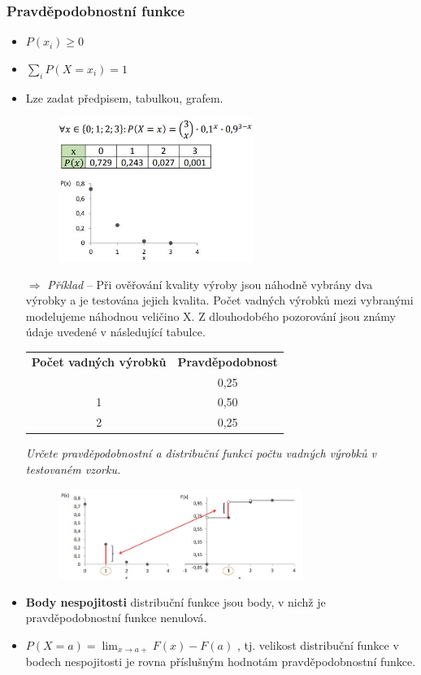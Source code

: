 \subsubsection{Pravděpodobnostní funkce}
			\begin{itemize}
				\item $P(x_i) \geq 0$
				\item $\sum_i P(X = x_i) = 1$
				\item Lze zadat předpisem, tabulkou, grafem.
				\begin{figure}[H]
					\centering
					\includegraphics[width=0.6\textwidth]{assets/11_dnv_prav}
				\end{figure}
				\item[$\Rightarrow$] \textit{Příklad} -- Při ověřování kvality výroby jsou náhodně vybrány dva výrobky a je testována jejich kvalita. Počet vadných výrobků mezi vybranými modelujeme náhodnou veličino X. Z dlouhodobého pozorování jsou známy údaje uvedené v následující tabulce.
				\begin{table}[H]
					\centering
					\begin{tabular}{c|c}
						\textbf{Počet vadných výrobků}            & \textbf{Pravděpodobnost} \\\hhline
						0      &   0,25      \\ 
						1      &   0,50    \\
						2	   &   0,25
					\end{tabular}
				\end{table}
				\textit{Určete pravděpodobnostní a distribuční funkci počtu vadných výrobků v testovaném vzorku.}
				\begin{figure}[H]
					\centering
					\includegraphics[width=0.75\textwidth]{assets/11_vztah_prav_dist_dnv}
				\end{figure}
				\item \textbf{Body nespojitosti} distribuční funkce jsou body, v nichž je pravděpodobnostní funkce nenulová.
				\item $P (X= a) = \lim_{x\to a+} F(x) - F(a)$ , tj. velikost  distribuční funkce v bodech nespojitosti je rovna příslušným hodnotám pravděpodobnostní funkce.
			\end{itemize}
